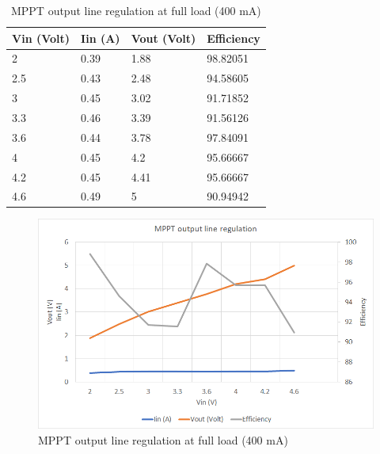 \begin{table}[H]
\centering
\begin{tabular}{|l|l|l|l|}
\hline
Vin (Volt) & Iin (A) & Vout (Volt) & Efficiency \\ \hline
2          & 0.39    & 1.88        & 98.82051   \\ \hline
2.5        & 0.43    & 2.48        & 94.58605   \\ \hline
3          & 0.45    & 3.02        & 91.71852   \\ \hline
3.3        & 0.46    & 3.39        & 91.56126   \\ \hline
3.6        & 0.44    & 3.78        & 97.84091   \\ \hline
4          & 0.45    & 4.2         & 95.66667   \\ \hline
4.2        & 0.45    & 4.41        & 95.66667   \\ \hline
4.6        & 0.49    & 5           & 90.94942   \\ \hline
\end{tabular}
\caption{MPPT output line regulation at full load (400 mA)}
\label{table:4}
\end{table}

\begin{figure}[h]
	\centering
	\includegraphics[width=\columnwidth]{IMGS/MPPT output line regulation at full load (400mA).png}
	\caption{MPPT output line regulation at full load (400 mA)}
	\label{fig:arch}
\end{figure}








